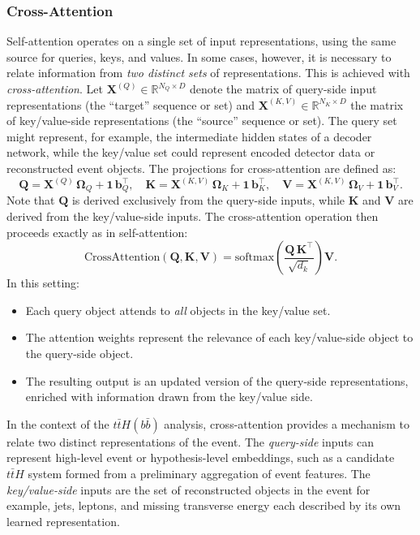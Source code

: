 \subsubsection{Cross-Attention}
Self-attention operates on a single set of input representations, using the same source for queries, keys, and values. In some cases, however, it is necessary to relate information from \emph{two distinct sets} of representations. This is achieved with \emph{cross-attention}. Let $\mathbf{X}^{(Q)} \in \mathbb{R}^{N_Q \times D}$ denote the matrix of query-side input representations (the ``target'' sequence or set) and $\mathbf{X}^{(K,V)} \in \mathbb{R}^{N_K \times D}$ the matrix of key/value-side representations (the ``source'' sequence or set). The query set might represent, for example, the intermediate hidden states of a decoder network, while the key/value set could represent encoded detector data or reconstructed event objects. The projections for cross-attention are defined as:
\begin{equation}
\mathbf{Q} = \mathbf{X}^{(Q)} \, \mathbf{\Omega}_Q + \mathbf{1} \, \mathbf{b}_Q^\top, \quad
\mathbf{K} = \mathbf{X}^{(K,V)} \, \mathbf{\Omega}_K + \mathbf{1} \, \mathbf{b}_K^\top, \quad
\mathbf{V} = \mathbf{X}^{(K,V)} \, \mathbf{\Omega}_V + \mathbf{1} \, \mathbf{b}_V^\top.
\end{equation}
Note that $\mathbf{Q}$ is derived exclusively from the query-side inputs, while $\mathbf{K}$ and $\mathbf{V}$ are derived from the key/value-side inputs. The cross-attention operation then proceeds exactly as in self-attention:
\begin{equation}
\mathrm{CrossAttention}(\mathbf{Q}, \mathbf{K}, \mathbf{V}) = \mathrm{softmax} \left( \frac{\mathbf{Q} \, \mathbf{K}^\top}{\sqrt{d_k}} \right) \mathbf{V}.
\end{equation}
In this setting:
\begin{itemize}
    \item Each query object attends to \emph{all} objects in the key/value set.
    \item The attention weights represent the relevance of each key/value-side object to the query-side object.
    \item The resulting output is an updated version of the query-side representations, enriched with information drawn from the key/value side.
\end{itemize}
In the context of the $t\bar{t}H(b\bar{b})$ analysis, cross-attention provides a mechanism to relate two distinct representations of the event. The \emph{query-side} inputs can represent high-level event or hypothesis-level embeddings, such as a candidate $t\bar{t}H$ system formed from a preliminary aggregation of event features. The \emph{key/value-side} inputs are the set of reconstructed objects in the event for example, jets, leptons, and missing transverse energy each described by its own learned representation.\\
